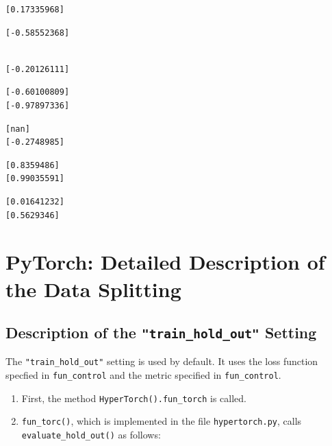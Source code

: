 \documentclass[
  letterpaper,
  DIV=11,
  numbers=noendperiod]{scrreprt}
\providecommand{\tightlist}{%
  \setlength{\itemsep}{0pt}\setlength{\parskip}{0pt}}\usepackage{longtable,booktabs,array}
\begin{document}
\begin{verbatim}
\end{verbatim}

\begin{verbatim}
[0.17335968]
\end{verbatim}

\begin{verbatim}
[-0.58552368]
\end{verbatim}

\begin{verbatim}

[-0.20126111]
\end{verbatim}

\begin{verbatim}
[-0.60100809]
[-0.97897336]
\end{verbatim}

\begin{verbatim}
[nan]
[-0.2748985]
\end{verbatim}

\begin{verbatim}
[0.8359486]
[0.99035591]
\end{verbatim}

\begin{verbatim}
[0.01641232]
[0.5629346]
\end{verbatim}

\newpage{}

\hypertarget{sec-detailed-data-splitting}{%
\section{PyTorch: Detailed Description of the Data
Splitting}\label{sec-detailed-data-splitting}}

\hypertarget{description-of-the-train_hold_out-setting}{%
\subsection{\texorpdfstring{Description of the
\texttt{"train\_hold\_out"}
Setting}{Description of the "train\_hold\_out" Setting}}\label{description-of-the-train_hold_out-setting}}

The \texttt{"train\_hold\_out"} setting is used by default. It uses the
loss function specfied in \texttt{fun\_control} and the metric specified
in \texttt{fun\_control}.

\begin{enumerate}
\def\labelenumi{\arabic{enumi}.}
\tightlist
\item
  First, the method \texttt{HyperTorch().fun\_torch} is called.
\item
  \texttt{fun\_torc()}, which is implemented in the file
  \texttt{hypertorch.py}, calls \texttt{evaluate\_hold\_out()} as
  follows:
\end{enumerate}
\end{document}
